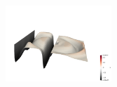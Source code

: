 \begin{center}
\includegraphics[width=4cm]{python_codes/fieldstone_165/results4/uuu0350.png}
\end{center}














